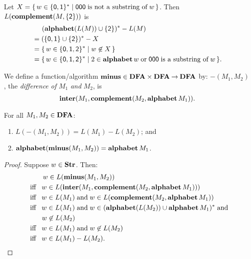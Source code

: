 Let $X=\{ \, w\in\{\mathsf{0,1}\}^* \mid \mathsf{000}\;\allowbreak\mbox{is not a
    substring of}\allowbreak\;w \, \}$.  Then $L(\mathbf{complement}(M,\{\mathsf{2}\}))$ is
\begin{alignat*}{2}
&\mathrel{\hspace*{.3cm}} (\mathbf{alphabet}(L(M))\cup\{\mathsf{2}\})^*-L(M) \\
&=(\{\mathsf{0,1}\}\cup\{\mathsf{2}\})^* - X \\
&=\{ \, w\in\{\mathsf{0,1,2}\}^* \mid w\not\in X \, \} \\
&=\{ \, w\in\{\mathsf{0,1,2}\}^* \mid 2\in\mathbf{alphabet}\,w\;\allowbreak\mbox{or}\allowbreak\;
\mathsf{000}\;\allowbreak\mbox{is a substring of}\allowbreak\;w \, \} .
\end{alignat*}

%
%
%
We define a function/algorithm $\mathbf{minus}\in\mathbf{DFA}\times\mathbf{DFA}\mathbin{\to}\mathbf{DFA}$ by:
$\minus(M_1,M_2)$, the \emph{difference of} $M_1$ \emph{and} $M_2$, is
\begin{gather*}
\mathbf{inter}(M_1,\mathbf{complement}(M_2,{\mathbf{alphabet}\,M_1})) .
\end{gather*}

\begin{theorem}
\label{DFAMinusTheorem}
For all $M_1,M_2\in\mathbf{DFA}$:
\begin{enumerate}[\quad(1)]
\item $L(\minus(M_1,M_2)) = L(M_1)-L(M_2)$; and

\item $\mathbf{alphabet}(\mathbf{minus}(M_1,M_2)) = \mathbf{alphabet}\,M_1$.
\end{enumerate}
\end{theorem}

\begin{proof}
Suppose $w\in\mathbf{Str}$.  Then:
\begin{align*}
&\hspace{.95cm} w\in L(\mathbf{minus}(M_1,M_2)) \\
&\mathrel{\;\;\allowbreak\mbox{iff}\allowbreak\;\;} w\in L(\mathbf{inter}(M_1,\mathbf{complement}(M_2,\mathbf{alphabet}\,M_1))) \\
&\mathrel{\;\;\allowbreak\mbox{iff}\allowbreak\;\;} w\in L(M_1)\;\allowbreak\mbox{and}\allowbreak\;w\in L(\mathbf{complement}(M_2,\mathbf{alphabet}\,M_1)) \\
&\mathrel{\;\;\allowbreak\mbox{iff}\allowbreak\;\;} w\in L(M_1)\;\allowbreak\mbox{and}\allowbreak\;w\in(\mathbf{alphabet}(L(M_2))\cup\mathbf{alphabet}\,M_1)^*\;\allowbreak\mbox{and}\allowbreak\; \\
&\qquad\;\; w\not\in L(M_2) \\
&\mathrel{\;\;\allowbreak\mbox{iff}\allowbreak\;\;} w\in L(M_1)\;\allowbreak\mbox{and}\allowbreak\;w\not\in L(M_2) \\
&\mathrel{\;\;\allowbreak\mbox{iff}\allowbreak\;\;} w\in L(M_1)-L(M_2) .
\end{align*}
\end{proof}

